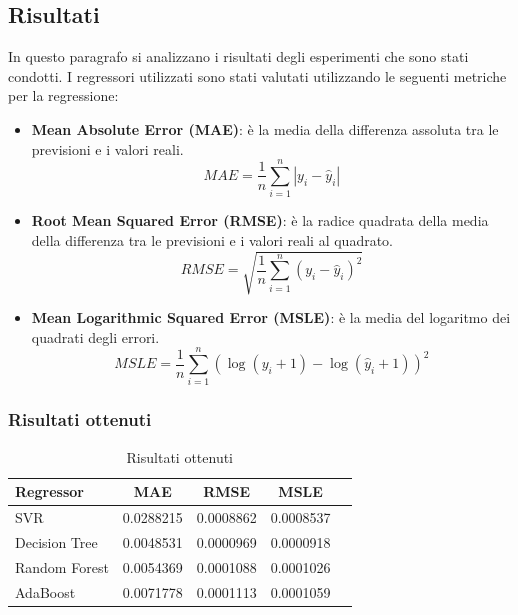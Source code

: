 \subsection{Risultati}

In questo paragrafo si analizzano i risultati degli esperimenti che sono stati condotti. I regressori utilizzati sono stati valutati utilizzando le seguenti metriche per la regressione:
\begin{itemize}
    \item \textbf{Mean Absolute Error (MAE)}: è la media della differenza assoluta tra le previsioni e i valori reali.
    \begin{equation*}
        MAE = \frac{1}{n} \sum_{i=1}^{n} |y_i - \hat{y}_i|
    \end{equation*}
    \item \textbf{Root Mean Squared Error (RMSE)}: è la radice quadrata della media della differenza tra le previsioni e i valori reali al quadrato.
    \begin{equation*}
        RMSE = \sqrt{\frac{1}{n} \sum_{i=1}^{n} (y_i - \hat{y}_i)^2}
    \end{equation*}
    \item \textbf{Mean Logarithmic Squared Error (MSLE)}: è la media del logaritmo dei quadrati degli errori.
    \begin{equation*}
        MSLE = \frac{1}{n} \sum_{i=1}^{n} (\log(y_i + 1) - \log(\hat{y}_i + 1))^2
    \end{equation*}
\end{itemize}

\subsubsection{Risultati ottenuti}

\begin{table}[H]
    \centering
    \begin{tabular}{|>{\centering\arraybackslash}m{5cm}|c|c|c|c|}
        \hline
        \textbf{Regressor} & \textbf{MAE} & \textbf{RMSE} & \textbf{MSLE} \\ [10pt]
        \hline
        SVR & 0.0288215 & 0.0008862 & 0.0008537 \\ [10pt]
        \hline
        Decision Tree & 0.0048531 & 0.0000969 & 0.0000918 \\ [10pt]
        \hline
        Random Forest & 0.0054369 & 0.0001088 & 0.0001026 \\ [10pt]
        \hline
        AdaBoost & 0.0071778 & 0.0001113 & 0.0001059 \\ [10pt]
        \hline
    \end{tabular}
    \caption{Risultati ottenuti}
    \label{tab:results}
\end{table}

